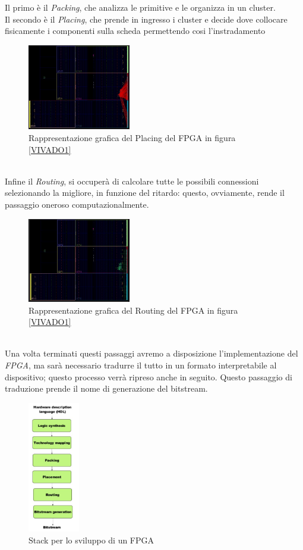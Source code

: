 Il primo è il \textit{Packing}, che analizza le primitive e le organizza in un cluster.\\
Il secondo è il \textit{Placing}, che prende in ingresso i cluster e decide dove collocare fisicamente i componenti sulla scheda permettendo cosi l'instradamento
\begin{figure}[h]
\centering
\includegraphics[width=0.4\textwidth]{images/Place.jpg}
\caption{Rappresentazione grafica del Placing del FPGA in figura \ref{VIVADO1}}
\end{figure}\\
Infine il \textit{Routing}, si occuperà di calcolare tutte le possibili connessioni selezionando la migliore, in funzione del ritardo: questo, ovviamente, rende il passaggio oneroso computazionalmente.
\begin{figure}[h]
\centering
\includegraphics[width=0.4\textwidth]{images/Route.jpg}
\caption{Rappresentazione grafica del Routing del FPGA in figura \ref{VIVADO1}}
\end{figure}\\
Una volta terminati questi passaggi avremo a disposizione l'implementazione del \textit{FPGA}, ma sarà necessario tradurre il tutto in un formato interpretabile al dispositivo; questo processo verrà ripreso anche in seguito. Questo passaggio di traduzione prende il nome di generazione del bitstream.
\begin{figure}[h]
\centering
\includegraphics[width=0.2\textwidth]{images/Stack.jpg}
\caption{Stack per lo sviluppo di un FPGA}
\end{figure}\\
